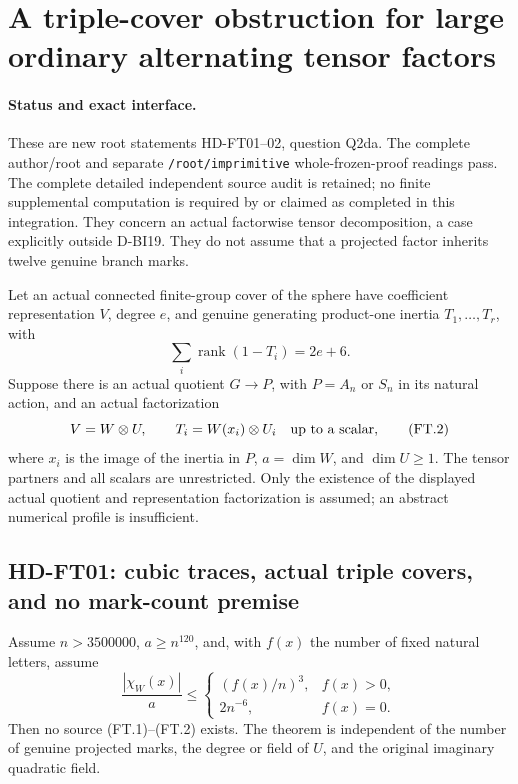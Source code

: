 \section{A triple-cover obstruction for large ordinary alternating tensor factors}
\label{sec:factorwise-triples}

\paragraph{Status and exact interface.}
These are new root statements HD-FT01--02, question Q2da.
The complete author/root and separate \texttt{/root/imprimitive}
whole-frozen-proof readings pass. The complete detailed independent
source audit is retained; no finite supplemental computation is
required by or claimed as completed in this integration. They concern an actual factorwise tensor decomposition, a
case explicitly outside D-BI19. They do not assume that a projected
factor inherits twelve genuine branch marks.

Let an actual connected finite-group cover of the sphere have coefficient
representation \(V\), degree \(e\), and genuine generating product-one
inertia \(T_1,\ldots,T_r\), with
\[
                  \sum_i\operatorname{rank}(1-T_i)=2e+6.
                  \tag{FT.1}
\]
Suppose there is an actual quotient \(G\longrightarrow P\), with
\(P=A_n\) or \(S_n\) in its natural action, and an actual factorization
\[
             V=W\otimes U,\qquad
             T_i=W(x_i)\otimes U_i
             \quad\hbox{up to a scalar},
             \tag{FT.2}
\]
where \(x_i\) is the image of the inertia in \(P\), \(a=\dim W\),
and \(\dim U\ge1\). The tensor partners and all scalars are unrestricted.
Only the existence of the displayed actual quotient and representation
factorization is assumed; an abstract numerical profile is insufficient.

\subsection{HD-FT01: cubic traces, actual triple covers, and no mark-count premise}

\begin{theorem}[HD-FT01]
Assume \(n>3500000\), \(a\ge n^{120}\), and, with \(f(x)\) the number
of fixed natural letters, assume
\[
 \frac{|\chi_W(x)|}{a}\le
 \begin{cases}
       (f(x)/n)^3,&f(x)>0,\\
       2n^{-6},&f(x)=0 .
 \end{cases}
 \tag{FT.3}
\]
Then no source (FT.1)--(FT.2) exists.
The theorem is independent of the number of genuine projected marks,
the degree or field of \(U\), and the original imaginary quadratic field.
\end{theorem}

